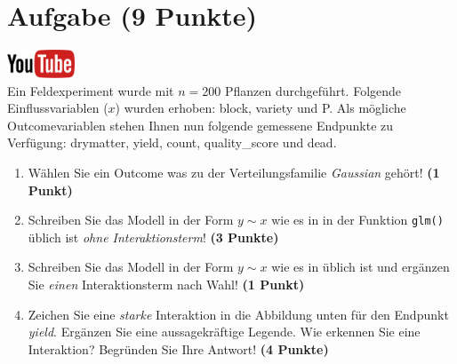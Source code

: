 \documentclass[a4paper, 9pt]{scrartcl}\usepackage[]{graphicx}\usepackage[]{xcolor}
\begin{document}
\section{Aufgabe \hfill (9 Punkte)}

\hfill\href{https://youtu.be/AwQEcQWLFCw}{\includegraphics[width =
  2cm]{img/youtube}}\\[1Ex]



Ein Feldexperiment wurde mit $n = 200$ Pflanzen durchgef{\"u}hrt. Folgende
Einflussvariablen ($x$) wurden erhoben: block, variety und P. Als m{\"o}gliche Outcomevariablen stehen Ihnen nun
folgende gemessene Endpunkte zu Verf{\"u}gung: drymatter, yield, count, quality\_score und dead.

\begin{enumerate}
\item W{\"a}hlen Sie ein Outcome was zu der Verteilungsfamilie
  \textit{Gaussian} geh{\"o}rt! \textbf{(1 Punkt)}
\item Schreiben Sie das Modell in der Form $y \sim x$ wie es in \Rlogo in
  der Funktion \texttt{glm()}
  {\"u}blich ist \textit{ohne Interaktionsterm}! \textbf{(3 Punkte)}
\item Schreiben Sie das Modell in der Form $y \sim x$ wie es in \Rlogo
  {\"u}blich ist und erg{\"a}nzen Sie \textit{einen} Interaktionsterm nach Wahl! \textbf{(1 Punkt)} 
\item Zeichen Sie eine \textit{starke}
  Interaktion in die Abbildung unten f{\"u}r den Endpunkt
  \textit{yield}. Erg{\"a}nzen Sie eine aussagekr{\"a}ftige Legende. Wie erkennen
  Sie eine Interaktion? Begr{\"u}nden Sie Ihre Antwort! \textbf{(4 Punkte)}
\end{enumerate}
\end{document}
